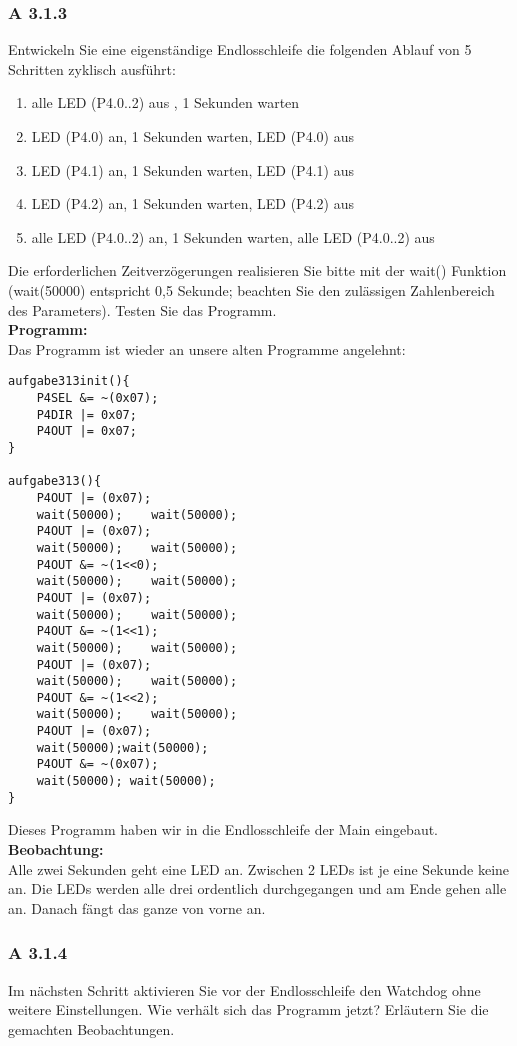 \subsubsection*{A 3.1.3}
	Entwickeln Sie eine eigenständige Endlosschleife die folgenden Ablauf von 5 Schritten zyklisch ausführt:
	\begin{enumerate}
        		\item alle LED (P4.0..2) aus , 1 Sekunden warten
        		\item LED (P4.0) an, 1 Sekunden warten, LED (P4.0) aus
	        	\item LED (P4.1) an, 1 Sekunden warten, LED (P4.1) aus
        		\item LED (P4.2) an, 1 Sekunden warten, LED (P4.2) aus
        		\item alle LED (P4.0..2) an, 1 Sekunden warten, alle LED (P4.0..2) aus
	\end{enumerate}
	Die erforderlichen Zeitverzögerungen realisieren Sie bitte mit der wait() Funktion (wait(50000) entspricht 0,5 Sekunde; beachten Sie den zulässigen 
	Zahlenbereich des Parameters). Testen Sie das Programm.\\
	
	\textbf{Programm:}\\
	Das Programm ist wieder an unsere alten Programme angelehnt:
	\begin{lstlisting}
aufgabe313init(){
	P4SEL &= ~(0x07);
	P4DIR |= 0x07;
	P4OUT |= 0x07;
}

aufgabe313(){
	P4OUT |= (0x07);
	wait(50000);	wait(50000);
	P4OUT |= (0x07);
	wait(50000);	wait(50000);
	P4OUT &= ~(1<<0);
	wait(50000);	wait(50000);
	P4OUT |= (0x07);
	wait(50000);	wait(50000);
	P4OUT &= ~(1<<1);
	wait(50000);	wait(50000);
	P4OUT |= (0x07);
	wait(50000);	wait(50000);
	P4OUT &= ~(1<<2);
	wait(50000);	wait(50000);
	P4OUT |= (0x07);
	wait(50000);wait(50000);
	P4OUT &= ~(0x07);
	wait(50000); wait(50000);
}
	\end{lstlisting}
	Dieses Programm haben wir in die Endlosschleife der Main eingebaut.\\
	
	\textbf{Beobachtung:}\\
	Alle zwei Sekunden geht eine LED an. Zwischen 2 LEDs ist je eine Sekunde keine an. Die LEDs werden alle drei ordentlich durchgegangen und am Ende
	gehen alle an. Danach fängt das ganze von vorne an.

\subsubsection*{A 3.1.4}
	Im nächsten Schritt aktivieren Sie vor der Endlosschleife den Watchdog ohne weitere Einstellungen. Wie verhält sich das Programm jetzt? Erläutern Sie 	
	die gemachten Beobachtungen.\\

